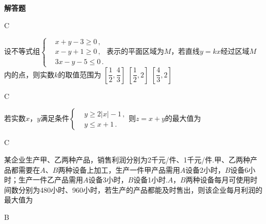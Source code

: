 \begin{exercise}{\bf 解答题}
\begin{exercise}
      \begin{answer}
        C
      \end{answer}
    \item %
      设不等式组$\left\{\begin{aligned}
        &x+y-3\geqslant0\,,\\
        &x-y+1\geqslant0\,,\\
        &3x-y-5\leqslant0\,.
      \end{aligned}\right.$表示的平面区域为$M$，若直线$y=kx$经过区域$M$内的点，则实数$k$的取值范围为\xz
      \xx{$(\dfrac1{2},2]$}
       {$[\dfrac1{2},\dfrac4{3}]$}
       {$[\dfrac1{2},2]$}
       {$[\dfrac4{3},2]$}
      \begin{answer}
        C
      \end{answer}
    \item %
      若实数$x$，$y$满足条件$\left\{\begin{aligned}
        &y\geqslant 2|x|-1\,,\\
        &y\leqslant x+1\,.
      \end{aligned}\right.$则$z=x+y$的最大值为\xz
      \begin{answer}
        C
      \end{answer}
    \item %
      某企业生产甲、乙两种产品，销售利润分别为2千元/件、1千元/件.甲、乙两种产品都需要在$A$、$B$两种设备上加工，生产一件甲产品需用$A$设备2小时，$B$设备6小时；生产一件乙产品需用$A$设备3小时，$B$设备1小时.$A$，$B$两种设备每月可使用时间数分别为480小时、960小时，若生产的产品都能及时售出，则该企业每月利润的最大值为\xz
      \begin{answer}
        B
      \end{answer}
    \item %

\end{exercise}
\end{exercise}
